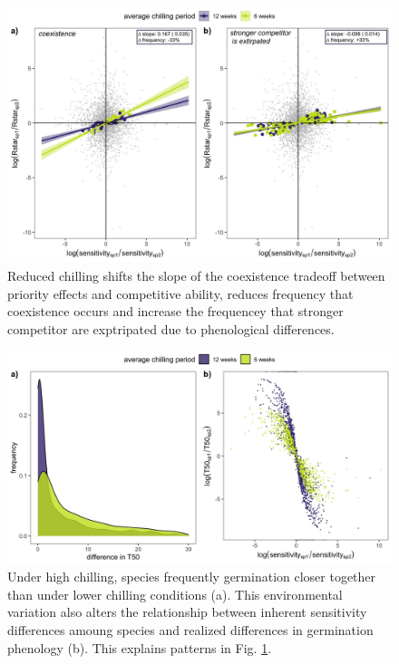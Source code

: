 \documentclass{article}[12pt]
\begin{document}
\begin{figure}[h!]
  \centering
 \includegraphics[width=\textwidth]{..//plots/coexistance_runner.jpeg}
    \caption{Reduced chilling shifts the slope of the coexistence tradeoff between priority effects and competitive ability, reduces frequency that coexistence occurs and increase the frequencey that stronger competitor are exptripated due to phenological differences.}
    \label{Fig:coexistence}
\end{figure}


\begin{figure}[h!]
  \centering
 \includegraphics[width=\textwidth]{..//plots/coexistance_chilldiffs.jpeg}
    \caption{Under high chilling, species frequently germination closer together  than under lower chilling conditions (a). This environmental variation also alters the relationship between inherent sensitivity differences amoung species and realized differences in germination phenology (b). This explains patterns in Fig. \ref{Fig:coexistence}.}
    \label{Fig:differences}
\end{figure}
\end{document}
